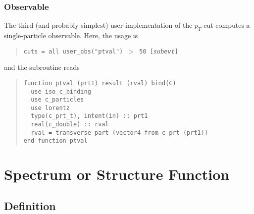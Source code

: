 \documentclass[12pt]{book}
\newcommand{\ttt}[1]{\texttt{#1}}
\begin{document}
\subsubsection{Observable}
The third (and probably simplest) user implementation of the $p_T$ cut
computes a single-particle observable.  Here, the usage is
\begin{quote}
  \begin{footnotesize}
    \ttt{cuts = all user\_obs("ptval") $>$ 50 [\emph{subevt}]}
  \end{footnotesize}
\end{quote}
and the subroutine reads
\begin{quote}
\begin{footnotesize}
\begin{verbatim}
function ptval (prt1) result (rval) bind(C)
  use iso_c_binding
  use c_particles
  use lorentz
  type(c_prt_t), intent(in) :: prt1
  real(c_double) :: rval
  rval = transverse_part (vector4_from_c_prt (prt1))
end function ptval
\end{verbatim}
\end{footnotesize}
\end{quote}


\section{Spectrum or Structure Function}

\subsection{Definition}
\end{document}

